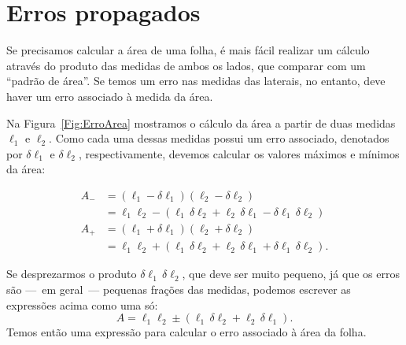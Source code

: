 \section{Erros propagados}

Se precisamos calcular a área de uma folha, é mais fácil realizar um cálculo através do produto das medidas de ambos os lados, que comparar com um ``padrão de área''. Se temos um erro nas medidas das laterais, no entanto, deve haver um erro associado à medida da área.

Na Figura~\ref{Fig:ErroArea} mostramos o cálculo da área a partir de duas medidas $\ell_1$ e $\ell_2$. Como cada uma dessas medidas possui um erro associado, denotados por $\delta\ell_1$ e $\delta\ell_2$, respectivamente, devemos calcular os valores máximos e mínimos da área:
%
\begin{marginfigure}[-2cm]
\centering
{}
\caption{Erro no cálculo da área de um retângulo.}
\label{Fig:ErroArea}
\end{marginfigure}
%
\begin{align}
	A_{-} &= (\ell_1 - \delta\ell_1)(\ell_2 - \delta\ell_2) \\
	&= \ell_1\ell_2 - (\ell_1 \,\delta\ell_2 + \ell_2\,\delta\ell_1 - \delta\ell_1\,\delta\ell_2) \\
	A_{+} &= (\ell_1 + \delta\ell_1)(\ell_2 + \delta\ell_2) \\
	&= \ell_1\ell_2 + (\ell_1 \,\delta\ell_2 + \ell_2\,\delta\ell_1 + \delta\ell_1\,\delta\ell_2).
\end{align}

\noindent{}Se desprezarmos o produto $\delta\ell_1\,\delta\ell_2$, que deve ser muito pequeno, já que os erros são ---~em geral~--- pequenas frações das medidas, podemos escrever as expressões acima como uma só:
\begin{equation}
	A = \ell_1\ell_2 \pm (\ell_1\,\delta\ell_2+\ell_2\,\delta\ell_1).
\end{equation}
%
Temos então uma expressão para calcular o erro associado à área da folha. 

